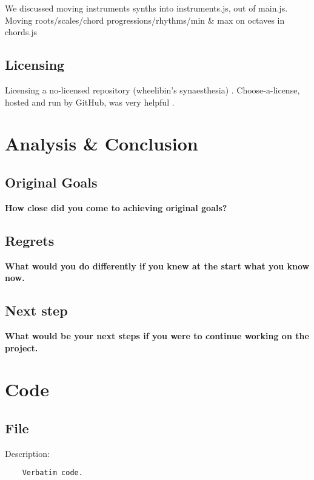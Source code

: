 \documentclass[12pt,a4paper]{article}
\begin{document}
We discussed moving instruments synths into instruments.js, out of main.js. Moving roots/scales/chord progressions/rhythms/min \& max on octaves in chords.js

\subsection{Licensing}

Licensing a no-licensed repository (wheelibin's synaesthesia) \cite{synaesthesia-license}. Choose-a-license, hosted and run by GitHub, was very helpful \cite{choose-license-none}.


\section{Analysis \& Conclusion}
\subsection{Original Goals}
\textbf{How close did you come to achieving original goals?}
\subsection{Regrets}
\textbf{What would you do differently if you knew at the start what you know now.}
\subsection{Next step}
\textbf{What would be your next steps if you were to continue working on the project.}


\section{Code}

\subsection{File}

\begin{center}
Description:
	\begin{verbatim}
	Verbatim code.
	\end{verbatim}
\end{center}
\end{document}
